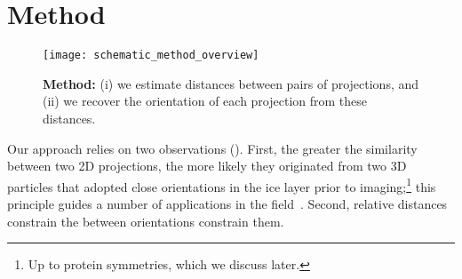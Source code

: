 \section{Method}


\begin{figure}
    \centering
    \texttt{[image: schematic\_method\_overview]}
    \caption{%
        \textbf{Method:}
        (i) we estimate distances between pairs of projections, and (ii) we recover the orientation of each projection from these distances.
    }\label{fig:schematic:method-overview}
\end{figure}

Our approach relies on two observations ().
First, the greater the similarity between two 2D projections, the more likely they originated from two 3D particles that adopted close orientations in the ice layer prior to imaging;\footnote{Up to protein symmetries, which we discuss later.} this principle guides a number of applications in the field~\cite{frank2006three}.
Second, relative distances constrain the between orientations constrain them.

